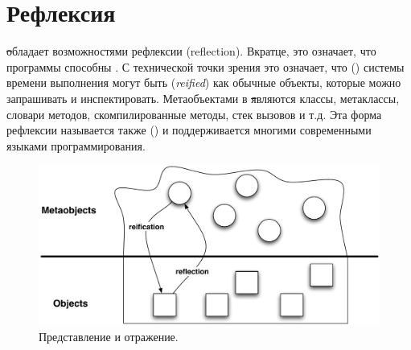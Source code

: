 \documentclass[a4paper,10pt,twoside]{book}
\begin{document}
	\sloppy
\fi

\chapter{Рефлексия}


\st обладает возможностями рефлексии (reflection).
Вкратце, это означает, что программы способны .
С технической точки зрения это означает, что  () системы времени выполнения могут быть  (\emph{reified}) как обычные объекты, которые можно запрашивать и инспектировать.
Метаобъектами в \st являются классы, метаклассы, словари методов, скомпилированные методы, стек вызовов и т.д.
Эта форма рефлексии называется также  () и поддерживается многими современными языками программирования.


\begin{figure}[ht]\centering
	\includegraphics[width=\linewidth]{reflect}
	\caption{Представление и отражение.}
\end{figure}
\end{document}
